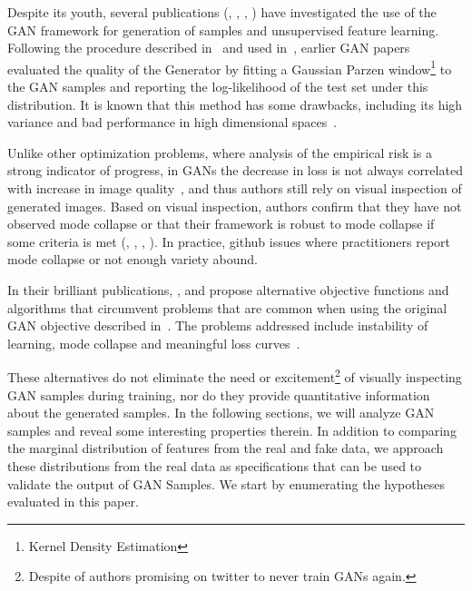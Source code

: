 Despite its youth, several publications (\cite{arjovsky2017towards}, 
\cite{salimans2016improved}, \cite{zhao2016energy}, 
\cite{radford2015unsupervised}) have investigated the use of the
GAN framework for generation of samples and unsupervised feature learning. 
Following the procedure described in~\cite{breuleux2011quickly} and
used in~\cite{goodfellow2014generative}, earlier GAN papers evaluated
the quality of the Generator by fitting a Gaussian Parzen window\footnote{Kernel
Density Estimation} to the GAN samples and reporting the log-likelihood of the
test set under this distribution. It is known that this method has some drawbacks, 
including its high variance and bad performance in high dimensional
spaces~\cite{goodfellow2014generative}.

Unlike other optimization problems, where analysis of
the empirical risk is a strong indicator of progress, in GANs the decrease in loss 
is not always correlated with increase in image quality~\cite{arjovsky2017wasserstein}, and thus authors still rely on visual 
inspection of generated images. Based on visual inspection, authors confirm that
they have not observed mode collapse or that their framework is robust to mode
collapse if some criteria is met (\cite{arjovsky2017wasserstein}, 
\cite{gulrajani2017improved}, \cite{mao2016least}, \cite{radford2015unsupervised}).
In practice, github issues where practitioners report mode collapse or not enough 
variety abound.

In their brilliant publications, \cite{mao2016least},
\cite{arjovsky2017wasserstein} and \cite{gulrajani2017improved} propose alternative
objective functions and algorithms that circumvent problems that are common when using the
original GAN objective described in~\cite{goodfellow2014generative}. The problems addressed include instability of learning,
mode collapse and meaningful loss curves~\cite{salimans2016improved}.

These alternatives do not eliminate the need or excitement\footnote{Despite of
authors promising on twitter to never train GANs again.} 
of visually inspecting GAN samples during training, nor do they provide
quantitative information about the generated samples. In the following sections, we
will analyze GAN samples and reveal some interesting properties therein. 
In addition to comparing the marginal distribution
of features from the real and fake data, we approach these distributions from
the real data as specifications that can be used to validate the output of GAN Samples. 
We start by enumerating the hypotheses evaluated in this paper.

